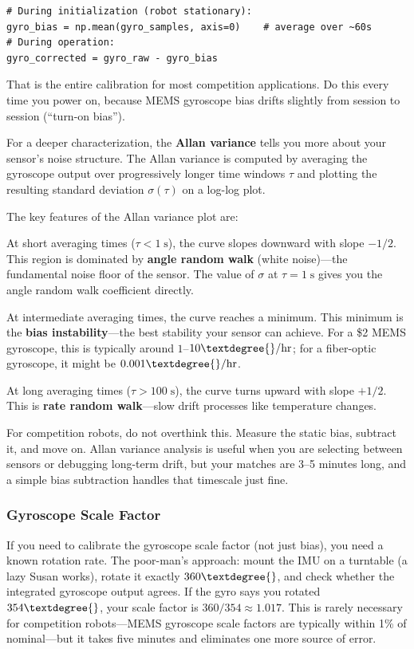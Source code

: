 \begin{verbatim}
# During initialization (robot stationary):
gyro_bias = np.mean(gyro_samples, axis=0)    # average over ~60s
# During operation:
gyro_corrected = gyro_raw - gyro_bias
\end{verbatim}

That is the entire calibration for most competition applications. Do this every time you power on, because MEMS gyroscope bias drifts slightly from session to session (``turn-on bias'').

For a deeper characterization, the \textbf{Allan variance} tells you more about your sensor's noise structure. The Allan variance is computed by averaging the gyroscope output over progressively longer time windows $\tau$ and plotting the resulting standard deviation $\sigma(\tau)$ on a log-log plot.

The key features of the Allan variance plot are:

At short averaging times ($\tau < 1\;\mathrm{s}$), the curve slopes downward with slope $-1/2$. This region is dominated by \textbf{angle random walk} (white noise)---the fundamental noise floor of the sensor. The value of $\sigma$ at $\tau = 1\;\mathrm{s}$ gives you the angle random walk coefficient directly.

At intermediate averaging times, the curve reaches a minimum. This minimum is the \textbf{bias instability}---the best stability your sensor can achieve. For a \$2 MEMS gyroscope, this is typically around $1$--$10\textdegree{}/\mathrm{hr}$; for a fiber-optic gyroscope, it might be $0.001\textdegree{}/\mathrm{hr}$.

At long averaging times ($\tau > 100\;\mathrm{s}$), the curve turns upward with slope $+1/2$. This is \textbf{rate random walk}---slow drift processes like temperature changes.

For competition robots, do not overthink this. Measure the static bias, subtract it, and move on. Allan variance analysis is useful when you are selecting between sensors or debugging long-term drift, but your matches are 3--5 minutes long, and a simple bias subtraction handles that timescale just fine.

\subsubsection{Gyroscope Scale Factor}

If you need to calibrate the gyroscope scale factor (not just bias), you need a known rotation rate. The poor-man's approach: mount the IMU on a turntable (a lazy Susan works), rotate it exactly $360\textdegree{}$, and check whether the integrated gyroscope output agrees. If the gyro says you rotated $354\textdegree{}$, your scale factor is $360/354 \approx 1.017$. This is rarely necessary for competition robots---MEMS gyroscope scale factors are typically within 1\% of nominal---but it takes five minutes and eliminates one more source of error.

